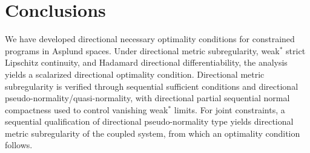 \documentclass[12pt,twoside,reqno]{amsart}
\theoremstyle{definition}
\numberwithin{equation}{section}
\begin{document}
\section{Conclusions}\label{sec:conclusions}
We have developed directional necessary optimality conditions for constrained programs in Asplund spaces. Under directional metric subregularity, weak\(^*\) strict Lipschitz continuity, and Hadamard directional differentiability, the analysis yields a scalarized directional optimality condition. Directional metric subregularity is verified through sequential sufficient conditions and directional pseudo-normality/quasi-normality, with directional partial sequential normal compactness used to control vanishing weak\(^*\) limits. For joint constraints, a sequential qualification of directional pseudo-normality type yields directional metric subregularity of the coupled system, from which an optimality condition follows. 



\vskip 6mm

\noindent

%


\end{document}
